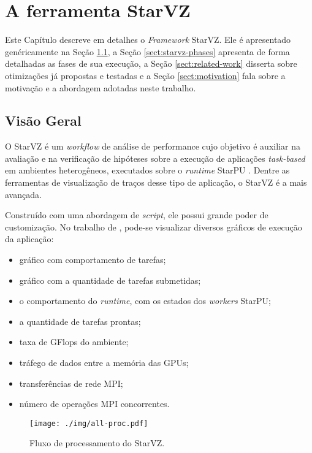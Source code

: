 \chapter{A ferramenta StarVZ} \label{ch:starvz}

Este Capítulo descreve em detalhes o \emph{Framework} StarVZ. Ele é 
apresentado genéricamente na Seção \ref{sect:starvz-overview}, a Seção 
\ref{sect:starvz-phases} apresenta de forma detalhadas as fases de sua 
execução, a Seção \ref{sect:related-work} disserta sobre otimizações já 
propostas e testadas e a Seção \ref{sect:motivation} fala sobre a motivação e a 
abordagem adotadas neste trabalho.

\section{Visão Geral}\label{sect:starvz-overview}

O StarVZ \cite{ref:starvz} é um \emph{workflow} de análise de performance cujo 
objetivo é auxiliar na avaliação e na verificação de hipóteses sobre a execução 
de aplicações \emph{task-based} em ambientes heterogêneos, executados sobre o
\emph{runtime} StarPU \cite{ref:starpu}. Dentre as ferramentas de visualização
de traços desse tipo de aplicação, o StarVZ é a mais avançada. 

Construído com uma abordagem de \textit{script}, ele possui grande poder de customização.
No trabalho de \citet{ref:starvz}, pode-se visualizar diversos gráficos de execução da aplicação:

\begin{itemize}
    \item gráfico com comportamento de tarefas;
    \item gráfico com a quantidade de tarefas submetidas;
    \item o comportamento do \emph{runtime}, com os estados dos \emph{workers} StarPU;
    \item a quantidade de tarefas prontas;
    \item taxa de GFlops do ambiente;
    \item tráfego de dados entre a memória das GPUs;
    \item transferências de rede MPI;
    \item número de operações MPI concorrentes.
\end{itemize}

\begin{figure}[ht]
 \centerline{\texttt{[image: ./img/all-proc.pdf]}}
 \caption{Fluxo de processamento do StarVZ.}
 \label{fig:starvz-workflow-general}
\end{figure}

